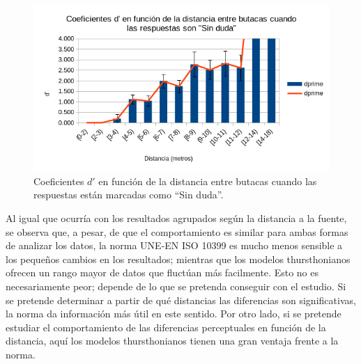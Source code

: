 \documentclass[11pt,a4paper,twoside]{book}
\begin{document}
            \begin{figure}
                \includegraphics[scale=0.7]{../imagenes/analisisThurstButacasSinDuda.png}
			    \centering
			    \caption{Coeficientes $d'$ en función de la distancia entre butacas cuando las respuestas están marcadas como ``Sin duda''.} 
			    \label{fig:ThurstButacasSinDuda}
            \end{figure}
            
            Al igual que ocurría con los resultados agrupados según la distancia a la fuente, se observa que, a pesar, de que el comportamiento es similar para ambas formas de analizar los datos, la norma UNE-EN ISO 10399 es mucho menos sensible a los pequeños cambios en los resultados; mientras que los modelos thursthonianos ofrecen un rango mayor de datos que fluctúan más facilmente. Esto no es necesariamente peor; depende de lo que se pretenda conseguir con el estudio. Si se pretende determinar a partir de qué distancias las diferencias son significativas, la norma da información más útil en este sentido. Por otro lado, si se pretende estudiar el comportamiento de las diferencias perceptuales en función de la distancia, aquí los modelos thursthonianos tienen una gran ventaja frente a la norma.
		    
		    

    
\end{document}
